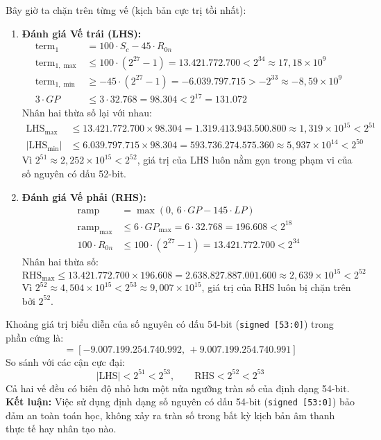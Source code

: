 Bây giờ ta chặn trên từng vế (kịch bản cực trị tồi nhất):
\begin{enumerate}
    \item \textbf{Đánh giá Vế trái (LHS):}
    \begin{align}
        \text{term}_1 &= 100 \cdot S_c - 45 \cdot R_{0n} \\
        \text{term}_{1,\max} &\le 100 \cdot (2^{27} - 1) = 13.421.772.700 < 2^{34} \approx 17{,}18 \times 10^9 \\
        \text{term}_{1,\min} &\ge -45 \cdot (2^{27} - 1) = -6.039.797.715 > -2^{33} \approx -8{,}59 \times 10^9 \\
        3 \cdot GP &\le 3 \cdot 32.768 = 98.304 < 2^{17} = 131.072
    \end{align}
    Nhân hai thừa số lại với nhau:
    \begin{align}
        \text{LHS}_{\max} &\le 13.421.772.700 \times 98.304 = 1.319.413.943.500.800 \approx 1{,}319 \times 10^{15} < 2^{51} \\
        |\text{LHS}_{\min}| &\le 6.039.797.715 \times 98.304 = 593.736.274.575.360 \approx 5{,}937 \times 10^{14} < 2^{50}
    \end{align}
    Vì $2^{51} \approx 2{,}252 \times 10^{15} < 2^{52}$, giá trị của LHS luôn nằm gọn trong phạm vi của số nguyên có dấu 52-bit.

    \item \textbf{Đánh giá Vế phải (RHS):}
    \begin{align}
        \text{ramp} &= \max(0,\, 6 \cdot GP - 145 \cdot LP) \\
        \text{ramp}_{\max} &\le 6 \cdot GP_{\max} = 6 \cdot 32.768 = 196.608 < 2^{18} \\
        100 \cdot R_{0n} &\le 100 \cdot (2^{27} - 1) = 13.421.772.700 < 2^{34}
    \end{align}
    Nhân hai thừa số:
    \begin{equation}
        \text{RHS}_{\max} \le 13.421.772.700 \times 196.608 = 2.638.827.887.001.600 \approx 2{,}639 \times 10^{15} < 2^{52}
    \end{equation}
    Vì $2^{52} \approx 4{,}504 \times 10^{15} < 2^{53} \approx 9{,}007 \times 10^{15}$, giá trị của RHS luôn bị chặn trên bởi $2^{52}$.
\end{enumerate}

Khoảng giá trị biểu diễn của số nguyên có dấu 54-bit (\texttt{signed [53:0]}) trong phần cứng là:
\begin{equation}
    [-2^{53},\, 2^{53} - 1] = [-9.007.199.254.740.992,\, +9.007.199.254.740.991]
\end{equation}
So sánh với các cận cực đại:
\begin{equation*}
    |\text{LHS}| < 2^{51} < 2^{53}, \qquad \text{RHS} < 2^{52} < 2^{53}
\end{equation*}
Cả hai vế đều có biên độ nhỏ hơn một nửa ngưỡng tràn số của định dạng 54-bit.
\textbf{Kết luận:} Việc sử dụng định dạng số nguyên có dấu 54-bit (\texttt{signed [53:0]}) bảo đảm an toàn toán học, không xảy ra tràn số trong bất kỳ kịch bản âm thanh thực tế hay nhân tạo nào.

